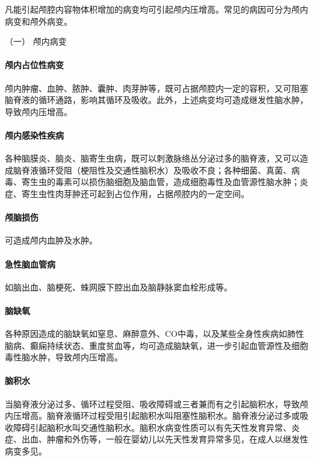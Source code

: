 凡能引起颅腔内容物体积增加的病变均可引起颅内压增高。常见的病因可分为颅内病变和颅外病变。

\hypertarget{text00107.htmlux5cux23CHP4-6-1-1-1}{}
（一） 颅内病变

\paragraph{颅内占位性病变}

颅内肿瘤、血肿、脓肿、囊肿、肉芽肿等，既可占据颅腔内一定的容积，又可阻塞脑脊液的循环通路，影响其循环及吸收。此外，上述病变均可造成继发性脑水肿，导致颅内压增高。

\paragraph{颅内感染性疾病}

各种脑膜炎、脑炎、脑寄生虫病，既可以刺激脉络丛分泌过多的脑脊液，又可以造成脑脊液循环受阻（梗阻性及交通性脑积水）及吸收不良；各种细菌、真菌、病毒、寄生虫的毒素可以损伤脑细胞及脑血管，造成细胞毒性及血管源性脑水肿；炎症、寄生虫性肉芽肿还可起到占位作用，占据颅腔内的一定空间。

\paragraph{颅脑损伤}

可造成颅内血肿及水肿。

\paragraph{急性脑血管病}

如脑出血、脑梗死、蛛网膜下腔出血及脑静脉窦血栓形成等。

\paragraph{脑缺氧}

各种原因造成的脑缺氧如窒息、麻醉意外、CO中毒，以及某些全身性疾病如肺性脑病、癫痫持续状态、重度贫血等，均可造成脑缺氧，进一步引起血管源性及细胞毒性脑水肿，导致颅内压增高。

\paragraph{脑积水}

当脑脊液分泌过多、循环过程受阻、吸收障碍或三者兼而有之引起脑积水，导致颅内压增高。脑脊液循环过程受阻引起脑积水叫阻塞性脑积水。脑脊液分泌过多或吸收障碍引起脑积水叫交通性脑积水。脑积水病变性质可以有先天性发育异常、炎症、出血、肿瘤和外伤等，一般在婴幼儿以先天性发育异常多见，在成人以继发性病变多见。

